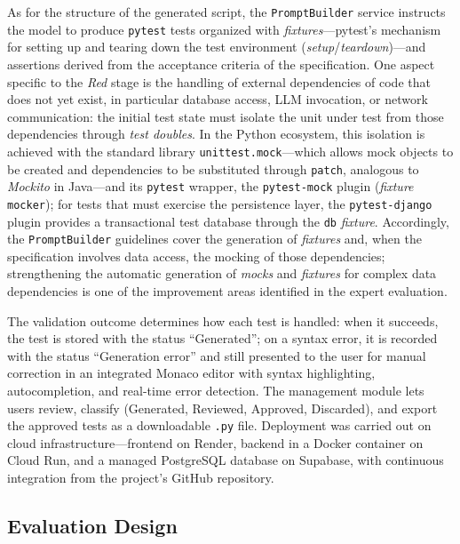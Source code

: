 \documentclass[10pt,journal,twoside,letterpaper]{IEEEtran}
\begin{document}
    As for the structure of the generated script, the \texttt{PromptBuilder} service instructs the model to produce \texttt{pytest} tests organized with \emph{fixtures}---pytest's mechanism for setting up and tearing down the test environment (\emph{setup}/\emph{teardown})---and assertions derived from the acceptance criteria of the specification. One aspect specific to the \emph{Red} stage is the handling of external dependencies of code that does not yet exist, in particular database access, LLM invocation, or network communication: the initial test state must isolate the unit under test from those dependencies through \emph{test doubles}. In the Python ecosystem, this isolation is achieved with the standard library \texttt{unittest.mock}---which allows mock objects to be created and dependencies to be substituted through \texttt{patch}, analogous to \emph{Mockito} in Java---and its \texttt{pytest} wrapper, the \texttt{pytest-mock} plugin (\emph{fixture} \texttt{mocker}); for tests that must exercise the persistence layer, the \texttt{pytest-django} plugin provides a transactional test database through the \texttt{db} \emph{fixture}. Accordingly, the \texttt{PromptBuilder} guidelines cover the generation of \emph{fixtures} and, when the specification involves data access, the mocking of those dependencies; strengthening the automatic generation of \emph{mocks} and \emph{fixtures} for complex data dependencies is one of the improvement areas identified in the expert evaluation.
    
    The validation outcome determines how each test is handled: when it succeeds, the test is stored with the status ``Generated''; on a syntax error, it is recorded with the status ``Generation error'' and still presented to the user for manual correction in an integrated Monaco editor with syntax highlighting, autocompletion, and real-time error detection. The management module lets users review, classify (Generated, Reviewed, Approved, Discarded), and export the approved tests as a downloadable \texttt{.py} file. Deployment was carried out on cloud infrastructure---frontend on Render, backend in a Docker container on Cloud Run, and a managed PostgreSQL database on Supabase, with continuous integration from the project's GitHub repository.
    
    \subsection{Evaluation Design}
    \label{subsec:validacion}
    
\end{document}
